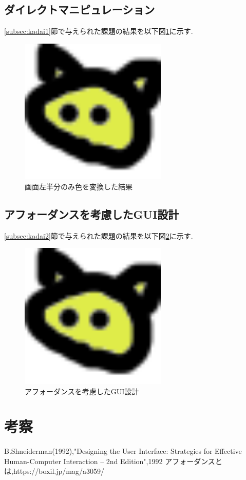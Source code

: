 \documentclass{jarticle}
\begin{document}
	\subsection{ダイレクトマニピュレーション}
	\ref{subsec:kadai1}節で与えられた課題の結果を以下図\ref{fig:kadai1}に示す.

	\begin{figure}[H]
	\begin{center}
	\includegraphics[width=7.0cm]{images/kadai1.png}
	\caption{画面左半分のみ色を変換した結果}
	\label{fig:kadai1}
	\end{center}
	\end{figure}


	\subsection{アフォーダンスを考慮したGUI設計}
	\ref{subsec:kadai2}節で与えられた課題の結果を以下図\ref{fig:kadai2}に示す.

	\begin{figure}[H]
	\begin{center}
	\includegraphics[width=7.0cm]{images/kadai2.png}
	\caption{アフォーダンスを考慮したGUI設計}
	\label{fig:kadai2}
	\end{center}
	\end{figure}


	\section{考察}

	\begin{thebibliography}{99}
	 B.Shneiderman(1992),"Designing the User Interface: Strategies for Effective Human-Computer Interaction -- 2nd Edition",1992
	 アフォーダンスとは,https://boxil.jp/mag/a3059/
	\end{thebibliography}
\end{document}
